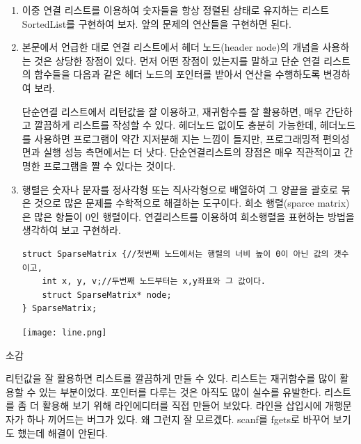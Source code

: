 \documentclass[11pt,a4paper]{article}
\begin{document}
\begin{enumerate}
\item 이중 연결 리스트를 이용하여 숫자들을 항상 정렬된 상태로 유지하는 리스트 SortedList를 구현하여 보자.
앞의 문제의 연산들을 구현하면 된다.


\item 본문에서 언급한 대로 연결 리스트에서 헤더 노드(header node)의 개념을 사용하는 것은 상당한 장점이 있다. 먼저 어떤 장점이 있는지를 말하고 단순 연결 리스트의 함수들을 다음과 같은 헤더 노드의 포인터를 받아서 연산을 수행하도록 변경하여 보라.

단순연결 리스트에서 리턴값을 잘 이용하고, 재귀함수를 잘 활용하면, 매우 간단하고 깔끔하게 리스트를 작성할 수 있다. 헤더노드 없이도 충분히 가능한데, 헤더노드를 사용하면 프로그램이 약간 지저분해 지는 느낌이 들지만, 프로그래밍적 편의성 면과 실행 성능 측면에서는 더 낫다. 단순연결리스트의 장점은 매우 직관적이고 간명한 프로그램을 짤 수 있다는 것이다.
\item 행렬은 숫자나 문자를 정사각형 또는 직사각형으로 배열하여 그 양끝을 괄호로 묶은 것으로 많은 문제를 수학적으로 해결하는 도구이다. 희소 행렬(sparce matrix)은 많은 항들이 0인 행렬이다. 
연결리스트를 이용하여 희소행렬을 표현하는 방법을 생각하여 보고 구현하라.
\begin{lstlisting}
struct SparseMatrix {//첫번째 노드에서는 행렬의 너비 높이 0이 아닌 값의 갯수이고, 
	int x, y, v;//두번째 노드부터는 x,y좌표와 그 값이다.
	struct SparseMatrix* node;
} SparseMatrix;
\end{lstlisting}

\texttt{[image: line.png]}
\end{enumerate}

\vspace{2cm}
{\Huge 소감}

리턴값을 잘 활용하면 리스트를 깔끔하게 만들 수 있다. 리스트는 재귀함수를 많이 활용할 수 있는 부분이었다. 포인터를 다루는 것은 아직도 많이 실수를 유발한다. 리스트를 좀 더 활용해 보기 위해 라인에디터를 직접 만들어 보았다. 라인을 삽입시에 개행문자가 하나 끼어드는 버그가 있다. 왜 그런지 잘 모르겠다. scanf를 fgets로 바꾸어 보기도 했는데 해결이 안된다.
\end{document}
